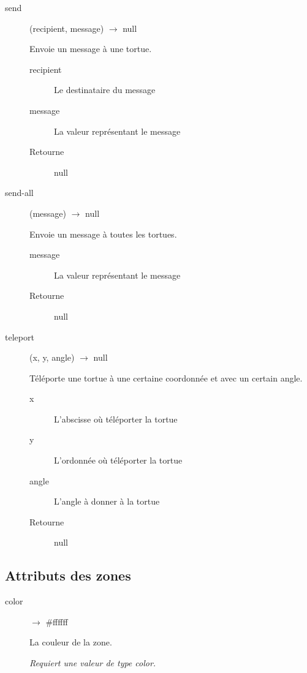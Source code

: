 \begin{description}
	\item[send] (recipient, message) $\rightarrow$ null

	Envoie un message à une tortue.

	\begin{description}
		\item[recipient] Le destinataire du message
		\item[message] La valeur représentant le message
		\item[Retourne] null
	\end{description}

	\item[send-all] (message) $\rightarrow$ null

	Envoie un message à toutes les tortues.

	\begin{description}
		\item[message] La valeur représentant le message
		\item[Retourne] null
	\end{description}

	\item[teleport] (x, y, angle) $\rightarrow$ null

	Téléporte une tortue à une certaine coordonnée et avec un certain angle.

	\begin{description}
		\item[x] L'abscisse où téléporter la tortue
		\item[y] L'ordonnée où téléporter la tortue
		\item[angle] L'angle à donner à la tortue
		\item[Retourne] null
	\end{description}
\end{description}

\subsection{Attributs des zones}

\begin{description}
	\item[color] $\rightarrow$ \#ffffff

	La couleur de la zone.

	\emph{Requiert une valeur de type color.}
\end{description}

